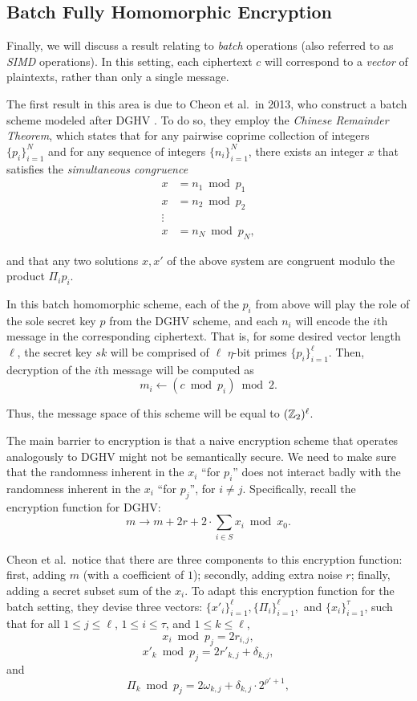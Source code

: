     \subsection{Batch Fully Homomorphic Encryption}

    Finally, we will discuss a result relating to \emph{batch} operations (also referred to as \emph{SIMD} operations). In this setting, each ciphertext $c$ will correspond to a \emph{vector} of plaintexts, rather than only a single message.

    The first result in this area is due to Cheon et al.~in 2013, who construct a batch scheme modeled after DGHV \cite{Cheon2013}. To do so, they employ the \emph{Chinese Remainder Theorem}, which states that for any pairwise coprime collection of integers $\{p_i\}_{i = 1}^N$ and for any sequence of integers $\{n_i\}_{i=1}^N$, there exists an integer $x$ that satisfies the \emph{simultaneous congruence}
    \begin{align*}
        x &= n_1 \bmod p_1 \\
        x &= n_2 \bmod p_2 \\
        \vdots\\
        x &= n_N \bmod p_N,
    \end{align*}

    and that any two solutions $x, x'$ of the above system are congruent modulo the product $\Pi_i p_i$.

    In this batch homomorphic scheme, each of the $p_i$ from above will play the role of the sole secret key $p$ from the DGHV scheme, and each $n_i$ will encode the $i$th message in the corresponding ciphertext. That is, for some desired vector length $\ell$, the secret key $sk$ will be comprised of $\ell$ $\eta$-bit primes $\{p_i\}_{i = 1}^\ell$. Then, decryption of the $i$th message will be computed as
    \[ m_i \leftarrow (c \bmod p_i) \bmod 2.\]

    Thus, the message space of this scheme will be equal to $(\mathbb{Z}_2)^\ell$.

    The main barrier to encryption is that a naive encryption scheme that operates analogously to DGHV might not be semantically secure. We need to make sure that the randomness inherent in the $x_i$ ``for $p_i$'' does not interact badly with the randomness inherent in the $x_i$ ``for $p_j$'', for $i \neq j$. Specifically, recall the encryption function for DGHV:
    \[ m \to m + 2r + 2 \cdot \sum_{i \in S} x_i \bmod x_0.\]

    Cheon et al.~notice that there are three components to this encryption function: first, adding $m$ (with a coefficient of $1$); secondly, adding extra noise $r$; finally, adding a secret subset sum of the $x_i$. To adapt this encryption function for the batch setting, they devise three vectors: $\{x'_i\}_{i = 1}^\ell, \{\Pi_i\}_{i = 1}^{\ell},$ and $\{x_i\}_{i = 1}^{\tau}$, such that for all $1 \leq j \leq \ell$, $1 \leq i \leq \tau$, and $1 \leq k \leq \ell$,
    \[x_i \bmod p_j = 2r_{i,j},\]
    \[x'_k \bmod p_j = 2 r'_{k, j} + \delta_{k, j},\]
    and
    \[\Pi_k \bmod p_j = 2 \omega_{k, j} + \delta_{k, j} \cdot 2^{\rho' + 1},\]

